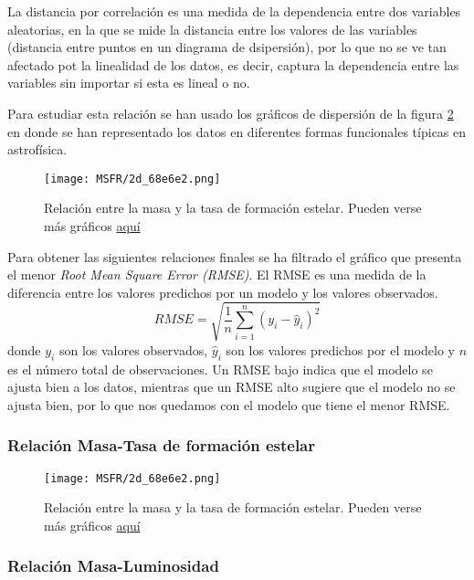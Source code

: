 \documentclass[11pt, a4paper]{article} %
\begin{document}
La distancia por correlación es una medida de la dependencia entre dos variables aleatorias, en la que se mide la distancia entre los valores de las variables (distancia entre puntos en un diagrama de dsipersión), por lo que no se ve tan afectado pot la 
linealidad de los datos, es decir, captura la dependencia entre las variables sin importar si esta es lineal o no.

Para estudiar esta relación se han usado los gráficos de dispersión de la figura \ref{fig:MSFR} en donde se han representado los datos en diferentes formas funcionales típicas en astrofísica.

\begin{figure}[H]
    \centering
    \texttt{[image: MSFR/2d\_68e6e2.png]}
    \caption{Relación entre la masa y la tasa de formación estelar. Pueden verse más gráficos \href{https://github.com/PhyAMR/TFG/tree/main/MSFR}{aquí}}
    \label{fig:MSFR}
\end{figure}

Para obtener las siguientes relaciones finales se ha filtrado el gráfico que presenta el menor \textit{Root Mean Square Error (RMSE)}. El RMSE es una medida de la diferencia entre los valores predichos por un modelo y los valores observados. 
\begin{equation}
    RMSE = \sqrt{\frac{1}{n}\sum_{i=1}^{n}(y_i - \hat{y}_i)^2}
\end{equation}
donde $y_i$ son los valores observados, $\hat{y}_i$ son los valores predichos por el modelo y $n$ es el número total de observaciones. Un RMSE bajo indica que el modelo se ajusta bien a los datos, mientras que un RMSE alto sugiere que el modelo no se ajusta bien, por lo que nos quedamos con el modelo que tiene el menor RMSE.
\subsubsection{Relación Masa-Tasa de formación estelar}
\begin{figure}[H]
    \centering
    \texttt{[image: MSFR/2d\_68e6e2.png]}
    \caption{Relación entre la masa y la tasa de formación estelar. Pueden verse más gráficos \href{https://github.com/PhyAMR/TFG/tree/main/MSFR}{aquí}}
    \label{fig:MSFR}
\end{figure}
\subsubsection{Relación Masa-Luminosidad}
\end{document}
